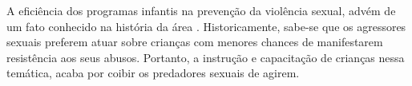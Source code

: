 
A eficiência dos programas infantis na prevenção da violência sexual, advém de um fato conhecido na história da área \cite{budin1989sex}. Historicamente, sabe-se que os agressores sexuais preferem atuar sobre crianças com menores chances de manifestarem resistência aos seus abusos. Portanto, a instrução e capacitação de crianças nessa temática, acaba por coibir os predadores sexuais de agirem. %












